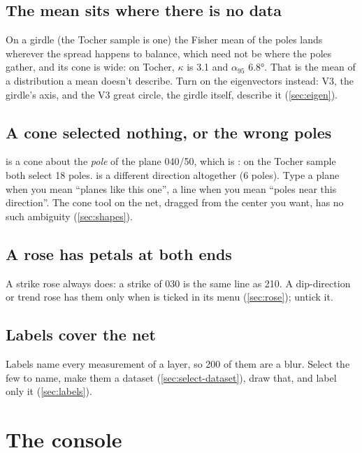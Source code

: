\subsection{The mean sits where there is no data}

On a girdle (the Tocher sample is one) the Fisher mean of the poles lands wherever the spread happens to
balance, which need not be where the poles gather, and its cone is wide: on Tocher, $\kappa$ is 3.1 and
$\alpha_{95}$ 6.8°. That is the mean of a distribution a mean doesn't describe. Turn on the eigenvectors
instead: V3, the girdle's axis, and the V3 great circle, the girdle itself, describe it
(\cref{sec:eigen}).

\subsection{A cone selected nothing, or the wrong poles}

 is a cone about the \emph{pole} of the plane 040/50, which is
: on the Tocher sample both select 18 poles.  is a different direction
altogether (6 poles). Type a plane when you mean \enquote{planes like this one}, a line when you mean
\enquote{poles near this direction}. The cone tool on the net, dragged from the center you want, has no
such ambiguity (\cref{sec:shapes}).

\subsection{A rose has petals at both ends}

A strike rose always does: a strike of 030 is the same line as 210. A dip-direction or trend rose has
them only when  is ticked in its menu (\cref{sec:rose}); untick it.

\subsection{Labels cover the net}

Labels name every measurement of a layer, so 200 of them are a blur. Select the few to name, make them a
dataset (\cref{sec:select-dataset}), draw that, and label only it (\cref{sec:labels}).

\section{The console}\label{sec:trouble-console}

